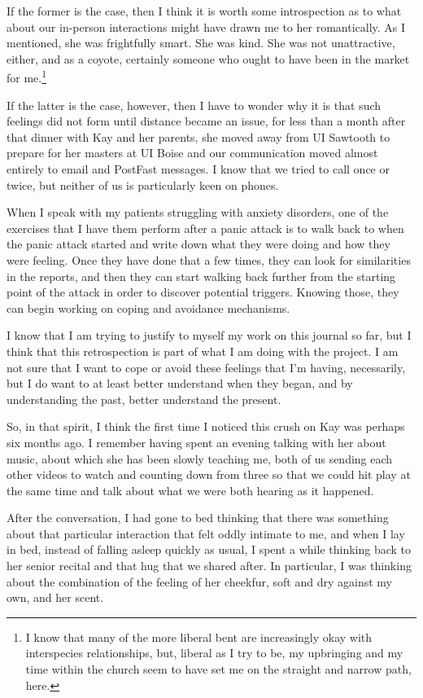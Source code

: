 If the former is the case, then I think it is worth some introspection as to what about our in-person interactions might have drawn me to her romantically. As I mentioned, she was frightfully smart. She was kind. She was not unattractive, either, and as a coyote, certainly someone who ought to have been in the market for me.\footnote{I know that many of the more liberal bent are increasingly okay with interspecies relationships, but, liberal as I try to be, my upbringing and my time within the church seem to have set me on the straight and narrow path, here.}

If the latter is the case, however, then I have to wonder why it is that such feelings did not form until distance became an issue, for less than a month after that dinner with Kay and her parents, she moved away from UI Sawtooth to prepare for her masters at UI Boise and our communication moved almost entirely to email and PostFast messages. I know that we tried to call once or twice, but neither of us is particularly keen on phones.

When I speak with my patients struggling with anxiety disorders, one of the exercises that I have them perform after a panic attack is to walk back to when the panic attack started and write down what they were doing and how they were feeling. Once they have done that a few times, they can look for similarities in the reports, and then they can start walking back further from the starting point of the attack in order to discover potential triggers. Knowing those, they can begin working on coping and avoidance mechanisms.

I know that I am trying to justify to myself my work on this journal so far, but I think that this retrospection is part of what I am doing with the project. I am not sure that I want to cope or avoid these feelings that I'm having, necessarily, but I do want to at least better understand when they began, and by understanding the past, better understand the present.

So, in that spirit, I think the first time I noticed this crush on Kay was perhaps six months ago. I remember having spent an evening talking with her about music, about which she has been slowly teaching me, both of us sending each other videos to watch and counting down from three so that we could hit play at the same time and talk about what we were both hearing as it happened.

After the conversation, I had gone to bed thinking that there was something about that particular interaction that felt oddly intimate to me, and when I lay in bed, instead of falling asleep quickly as usual, I spent a while thinking back to her senior recital and that hug that we shared after. In particular, I was thinking about the combination of the feeling of her cheekfur, soft and dry against my own, and her scent.

